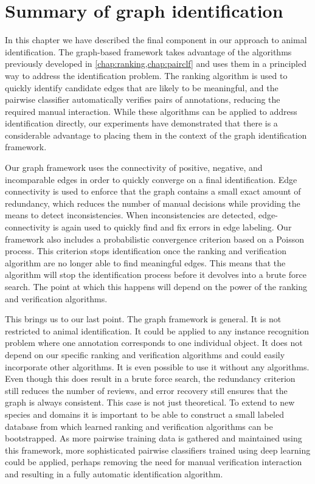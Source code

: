    \ErrorSizeDetails{}

    \ErrorGroupDetails{}

 
\FloatBarrier{}
\section{Summary of graph identification}\label{sec:graphconclusion}

In this chapter we have described the final component in our approach to animal identification.
The graph-based framework takes advantage of the algorithms previously developed in
  \cref{chap:ranking,chap:pairclf} and uses them in a principled way to address the identification problem.
The ranking algorithm is used to quickly identify candidate edges that are likely to be meaningful, and the
  pairwise classifier automatically verifies pairs of annotations, reducing the required manual interaction.
While these algorithms can be applied to address identification directly, our experiments have demonstrated that
  there is a considerable advantage to placing them in the context of the graph identification framework.

Our graph framework uses the connectivity of positive, negative, and incomparable edges in order to quickly
  converge on a final identification.
Edge connectivity is used to enforce that the graph contains a small exact amount of redundancy, which reduces
  the number of manual decisions while providing the means to detect inconsistencies.
When inconsistencies are detected, edge-connectivity is again used to quickly find and fix errors in edge
  labeling.
Our framework also includes a probabilistic convergence criterion based on a Poisson process.
This criterion stops identification once the ranking and verification algorithm are no longer able to find
  meaningful edges.
This means that the algorithm will stop the identification process before it devolves into a brute force search.
The point at which this happens will depend on the power of the ranking and verification algorithms.

This brings us to our last point.
The graph framework is general.
It is not restricted to animal identification.
It could be applied to any instance recognition problem where one annotation corresponds to one individual
  object.
It does not depend on our specific ranking and verification algorithms and could easily incorporate other
  algorithms.
It is even possible to use it without any algorithms.
Even though this does result in a brute force search, the redundancy criterion still reduces the number of
  reviews, and error recovery still ensures that the graph is always consistent.
This case is not just theoretical.
To extend to new species and domains it is important to be able to construct a small labeled database from which
  learned ranking and verification algorithms can be bootstrapped.
As more pairwise training data is gathered and maintained using this framework, more sophisticated pairwise
  classifiers trained using deep learning could be applied, perhaps removing the need for manual verification
  interaction and resulting in a fully automatic identification algorithm.

